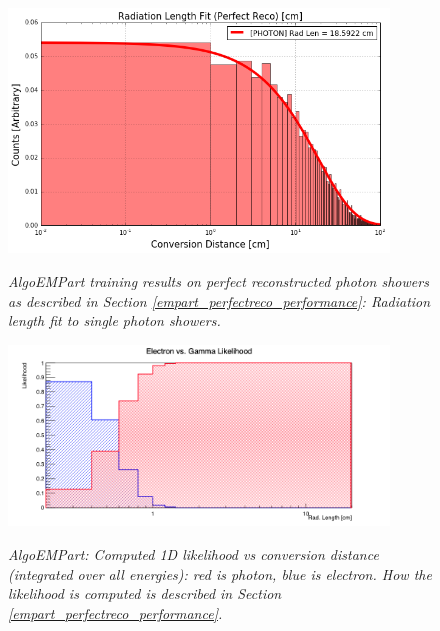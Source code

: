 \begin{figure}[ht!]
\centering
\includegraphics[width=0.9\textwidth]{Figures/EMPartTraining/mc_trained/RadLength_Selected_g.png}\\
\caption{\textit{AlgoEMPart training results on perfect reconstructed photon showers as described in Section \ref{empart_perfectreco_performance}: Radiation length fit to single photon showers.}}
\label{empart_perfectreco_performance_fig7}
\end{figure}


\begin{figure}[ht!]
\centering
\includegraphics[width=0.9\textwidth]{Figures/EMPartTraining/mc_trained/Likelihood_radLen.png}\\
\caption{\textit{AlgoEMPart: Computed 1D likelihood vs conversion distance (integrated over all energies): red is photon, blue is electron. How the likelihood is computed is described in Section \ref{empart_perfectreco_performance}.}}
\label{empart_perfectreco_performance_fig5}
\end{figure}

